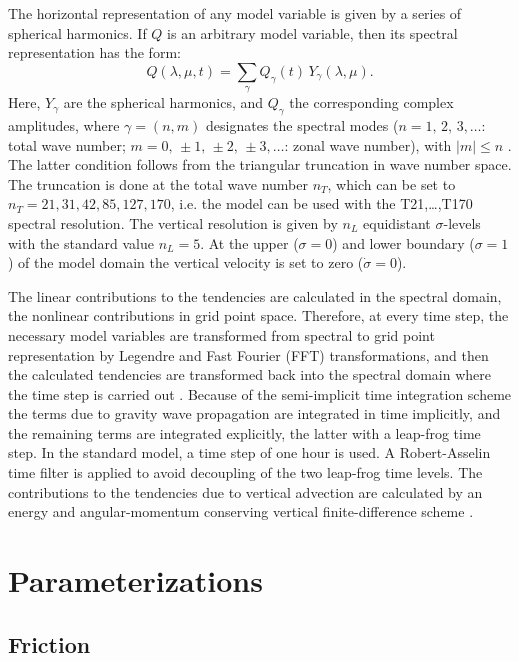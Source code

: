 The horizontal representation of any model variable is given
by a series of spherical harmonics. If $Q$ is an arbitrary
model variable, then its spectral representation has the form:
\begin{equation}
\label{spektral}
Q(\lambda,\mu,t) = \sum_\gamma Q_\gamma(t)\,Y_\gamma(\lambda,\mu).
\end{equation}
Here, $Y_\gamma$ are the spherical harmonics, and $Q_\gamma$ the
corresponding complex amplitudes, where $\gamma=(n,m)$ designates
the spectral modes ($n=1,\,2,\,3,\ldots$: total wave number;
$m=0,\,\pm1,\,\pm2,\,\pm3,\ldots$: zonal wave number),
with $|m|\le n$ \citep{holton}. The latter condition follows
from the triangular truncation in wave number space.
The truncation is done at the total wave number $n_T$, which
can be set to $n_T=21,31,42,85,127,170$, i.e. the model can be
used with the T21,\ldots,T170 spectral resolution. The vertical
resolution is given by $n_L$ equidistant $\sigma$-levels with the
standard value $n_L=5$. At the upper ($\sigma=0$) and lower boundary
($\sigma=1$) of the model domain the vertical velocity is set to zero
($\dot{\sigma}=0$).

The linear contributions to the tendencies are calculated in the spectral 
domain, the nonlinear contributions in grid point space. Therefore, at 
every time step, the necessary model variables are transformed from 
spectral to grid point representation by Legendre and Fast Fourier (FFT)
transformations, and then the calculated tendencies are transformed back 
into the spectral domain where the time step is carried out 
\citep[for the transform method see][]{orszag70, eliasen70}. Because of 
the semi-implicit time integration scheme \citep*{hossim75, simhosburr78} 
the terms due to gravity wave propagation are integrated in time implicitly, 
and the remaining terms are integrated explicitly, the latter with a 
leap-frog time step. In the standard model, a time step of one hour is used. 
A Robert-Asselin time filter \citep*{halwilli} is applied to avoid decoupling 
of the two leap-frog time levels. The contributions to the tendencies due 
to vertical advection are calculated by an energy and angular-momentum 
conserving vertical finite-difference scheme \citep*{simburr81}.

\section{Parameterizations}
\label{parametrisierungen}

\subsection{Friction}

